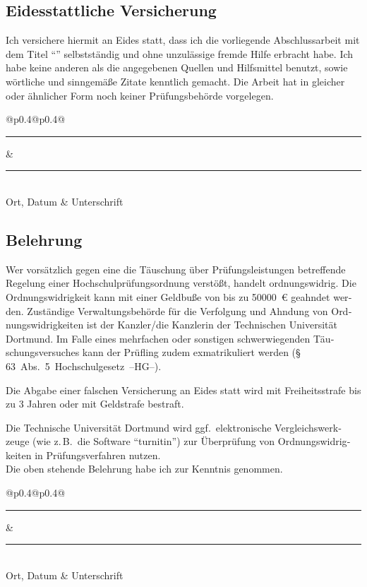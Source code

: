 \thispagestyle{empty}
\begin{german}

\section*{Eidesstattliche Versicherung}
Ich versichere hiermit an Eides statt, dass ich die vorliegende Abschlussarbeit mit dem Titel \enquote{\thetitle} selbstständig und ohne unzulässige fremde Hilfe erbracht habe.
Ich habe keine anderen als die angegebenen Quellen und Hilfsmittel benutzt, sowie wörtliche und sinngemäße Zitate kenntlich gemacht.
Die Arbeit hat in gleicher oder ähnlicher Form noch keiner Prüfungsbehörde vorgelegen.

\vspace*{1cm}\noindent
\begin{center}
  \begin{tabular}{@{}p{0.4\textwidth}@{\hspace{0.15\textwidth}}p{0.4\textwidth}@{}}
  \rule{\linewidth}{0.25pt}& \rule{\linewidth}{0.25pt}\\
  Ort, Datum & Unterschrift
  \end{tabular}
\end{center}

\subsection*{Belehrung}
Wer vorsätzlich gegen eine die Täuschung über Prüfungsleistungen betreffende Regelung einer Hochschulprüfungsordnung verstößt, handelt ordnungswidrig.
Die Ordnungswidrigkeit kann mit einer Geldbuße von bis zu \SI[round-mode=places, round-precision=2]{50000}{€} geahndet werden.
Zuständige Verwaltungsbehörde für die Verfolgung und Ahndung von Ordnungswidrigkeiten ist der Kanzler/die Kanzlerin der Technischen Universität Dortmund.
Im Falle eines mehrfachen oder sonstigen schwerwiegenden Täuschungsversuches kann der Prüfling zudem exmatrikuliert werden \mbox{(\S\,63 Abs. 5 Hochschulgesetz --HG--).}

Die Abgabe einer falschen Versicherung an Eides statt wird mit Freiheitsstrafe bis zu 3 Jahren oder mit Geldstrafe bestraft.

Die Technische Universität Dortmund wird ggf.\ elektronische Vergleichswerkzeuge (wie z.\,B.\ die Software \enquote{turnitin}) zur Überprüfung von Ordnungswidrigkeiten in Prüfungsverfahren nutzen. \\[\baselineskip]

\noindent Die oben stehende Belehrung habe ich zur Kenntnis genommen.\\[1cm]
\begin{center}
\begin{tabular}{@{}p{0.4\textwidth}@{\hspace{0.15\textwidth}}p{0.4\textwidth}@{}}
\rule{\linewidth}{0.25pt}& \rule{\linewidth}{0.25pt}\\
Ort, Datum & Unterschrift
\end{tabular}
\end{center}

\end{german}
